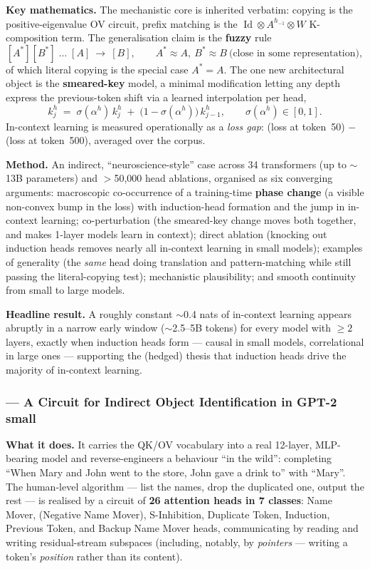 \textbf{Key mathematics.} The mechanistic core is inherited verbatim: copying is the positive-eigenvalue OV circuit, prefix matching is the $\operatorname{Id}\otimes A^{h_{-1}}\otimes W$ K-composition term. The generalisation claim is the \textbf{fuzzy} rule
\[
[A^{*}][B^{*}]\;\dots\;[A]\ \to\ [B], \qquad A^{*}\approx A,\ B^{*}\approx B \ \text{(close in some representation)},
\]
of which literal copying is the special case $A^{*}=A$. The one new architectural object is the \textbf{smeared-key} model, a minimal modification letting any depth express the previous-token shift via a learned interpolation per head,
\[
k^{h}_{j} \;=\; \sigma(\alpha^{h})\,k^{h}_{j} \;+\; \big(1-\sigma(\alpha^{h})\big)\,k^{h}_{j-1},
\qquad \sigma(\alpha^{h})\in[0,1].
\]
In-context learning is measured operationally as a \emph{loss gap}: (loss at token~50) $-$ (loss at token~500), averaged over the corpus.

\textbf{Method.} An indirect, ``neuroscience-style'' case across 34 transformers (up to $\sim$13B parameters) and $>$50{,}000 head ablations, organised as six converging arguments: macroscopic co-occurrence of a training-time \textbf{phase change} (a visible non-convex bump in the loss) with induction-head formation and the jump in in-context learning; co-perturbation (the smeared-key change moves both together, and makes 1-layer models learn in context); direct ablation (knocking out induction heads removes nearly all in-context learning in small models); examples of generality (the \emph{same} head doing translation and pattern-matching while still passing the literal-copying test); mechanistic plausibility; and smooth continuity from small to large models.

\textbf{Headline result.} A roughly constant $\sim$0.4 nats of in-context learning appears abruptly in a narrow early window ($\sim$2.5--5B tokens) for every model with $\ge 2$ layers, exactly when induction heads form --- causal in small models, correlational in large ones --- supporting the (hedged) thesis that induction heads drive the majority of in-context learning.

\subsubsection*{\textcite{interpretability-in-the-wild-ioi} --- A Circuit for Indirect Object Identification in GPT-2 small}

\textbf{What it does.} It carries the QK/OV vocabulary into a real 12-layer, MLP-bearing model and reverse-engineers a behaviour ``in the wild'': completing ``When Mary and John went to the store, John gave a drink to'' with ``Mary''. The human-level algorithm --- list the names, drop the duplicated one, output the rest --- is realised by a circuit of \textbf{26 attention heads in 7 classes}: Name Mover, (Negative Name Mover), S-Inhibition, Duplicate Token, Induction, Previous Token, and Backup Name Mover heads, communicating by reading and writing residual-stream subspaces (including, notably, by \emph{pointers} --- writing a token's \emph{position} rather than its content).

